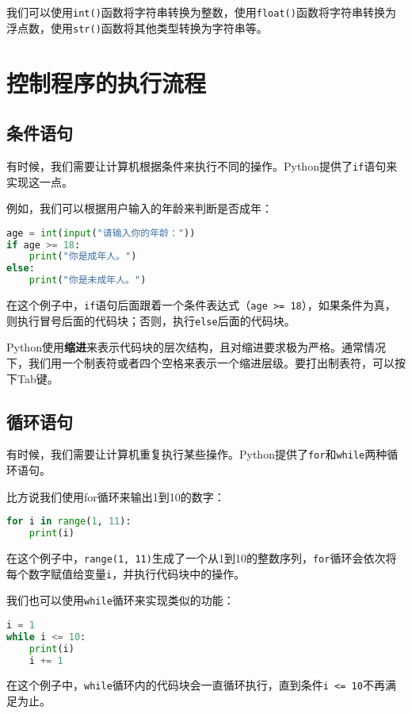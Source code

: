 \documentclass[../main.tex]{subfiles}
\begin{document}
我们可以使用\texttt{int()}函数将字符串转换为整数，使用\texttt{float()}函数将字符串转换为浮点数，使用\texttt{str()}函数将其他类型转换为字符串等。




\section{控制程序的执行流程}

\subsection{条件语句}

有时候，我们需要让计算机根据条件来执行不同的操作。Python提供了\texttt{if}语句来实现这一点。

例如，我们可以根据用户输入的年龄来判断是否成年：
\begin{lstlisting}[language=python]
age = int(input("请输入你的年龄："))
if age >= 18:
    print("你是成年人。")
else:
    print("你是未成年人。")
\end{lstlisting}
在这个例子中，\texttt{if}语句后面跟着一个条件表达式（\texttt{age >= 18}），如果条件为真，则执行冒号后面的代码块；否则，执行\texttt{else}后面的代码块。

Python使用\textbf{缩进}来表示代码块的层次结构，且对缩进要求极为严格。通常情况下，我们用一个制表符或者四个空格来表示一个缩进层级。要打出制表符，可以按下Tab键。

\subsection{循环语句}

有时候，我们需要让计算机重复执行某些操作。Python提供了\texttt{for}和\texttt{while}两种循环语句。

比方说我们使用for循环来输出1到10的数字：
\begin{lstlisting}[language=python]
for i in range(1, 11):
    print(i)
\end{lstlisting}
在这个例子中，\texttt{range(1, 11)}生成了一个从1到10的整数序列，\texttt{for}循环会依次将每个数字赋值给变量\texttt{i}，并执行代码块中的操作。

我们也可以使用\texttt{while}循环来实现类似的功能：
\begin{lstlisting}[language=python]
i = 1
while i <= 10:
    print(i)
    i += 1
\end{lstlisting}
在这个例子中，\texttt{while}循环内的代码块会一直循环执行，直到条件\texttt{i <= 10}不再满足为止。
\end{document}
